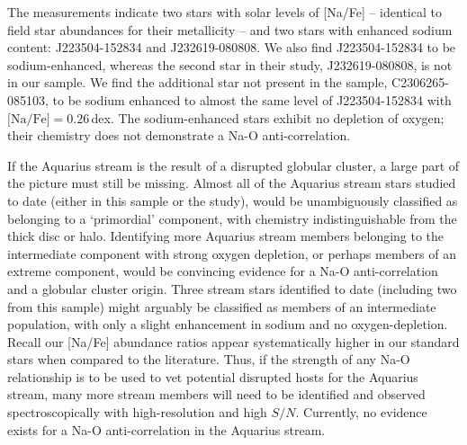 \documentclass{emulateapj}
\begin{document}



The \citet{wylie-de-boer;et-al_2012} measurements indicate two stars with solar levels of [Na/Fe] -- identical to field star abundances for their metallicity -- and two stars with enhanced sodium content: {J223504-152834} and {J232619-080808}. We also find {J223504-152834} to be sodium-enhanced, whereas the second star in their study, {J232619-080808}, is not in our sample. We find the additional star not present in the \citet{wylie-de-boer;et-al_2012} sample, {C2306265-085103}, to be sodium enhanced to almost the same level of {J223504-152834} with {$\mbox{[Na/Fe]} = 0.26$\,dex}. The sodium-enhanced stars exhibit no depletion of oxygen; their chemistry does not demonstrate a {Na-O} anti-correlation. 


If the Aquarius stream is the result of a disrupted globular cluster, a large part of the picture must still be missing. Almost all of the Aquarius stream stars studied to date (either in this sample or the \citet{wylie-de-boer;et-al_2012} study), would be unambiguously classified as belonging to a `primordial' component, with chemistry indistinguishable from the thick disc or halo. Identifying more Aquarius stream members belonging to the intermediate component with strong oxygen depletion, or perhaps members of an extreme component, would be convincing evidence for a {Na-O} anti-correlation and a globular cluster origin. Three stream stars identified to date (including two from this sample) might arguably be classified as members of an intermediate population, with only a slight enhancement in sodium and no oxygen-depletion. Recall our [Na/Fe] abundance ratios appear systematically higher in our standard stars when compared to the literature. Thus, if the strength of any {Na-O} relationship is to be used to vet potential disrupted hosts for the Aquarius stream, many more stream members will need to be identified and observed spectroscopically with high-resolution and high $S/N$. Currently, no evidence exists for a {Na-O} anti-correlation in the Aquarius stream.
\end{document}
